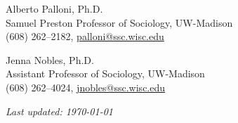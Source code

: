 \documentclass[10pt,letterpaper]{article}
\renewenvironment{itemize}{
  \begin{list}{}{
    \setlength{\leftmargin}{1.5em}
    \setlength{\itemsep}{0.25em}
    \setlength{\parskip}{0pt}
    \setlength{\parsep}{0.25em}
  }
}{
  \end{list}
}
\begin{document}
\begin{itemize}
\item Alberto Palloni, Ph.D.\\
Samuel Preston Professor of Sociology, UW-Madison\\
(608) 262--2182, \href{mailto:palloni@ssc.wisc.edu}{palloni@ssc.wisc.edu}

\item Jenna Nobles, Ph.D.\\
Assistant Professor of Sociology, UW-Madison\\
(608) 262--4024, \href{mailto:jnobles@ssc.wisc.edu}{jnobles@ssc.wisc.edu}
\end{itemize}

\bigskip
\bigskip
\begin{center}
  \begin{small}
    \textit{Last updated: \today}
  \end{small}
\end{center}

\end{document}
